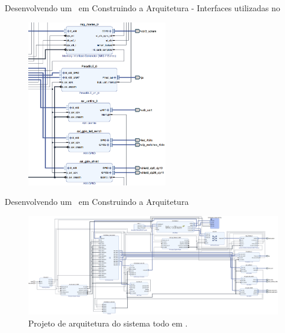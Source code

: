 \begin{frame}{Desenvolvendo um \Wearable\ em \Software }{Construindo a Arquitetura - Interfaces utilizadas no \design}
\vspace{-0.8em}
\begin{figure}[h] \centering
    \includegraphics[width=0.55\textwidth]{img/vivado_software/6-axi_outputs.png}
    \vspace{-1em}
\end{figure}
\end{frame}

\begin{frame}{Desenvolvendo um \Wearable\ em \Software }{Construindo a Arquitetura}
\vspace{-0.8em}
\begin{figure}[h] \centering
    \includegraphics[width=1\textwidth]{img/vivado_software/7-all.png}
    \vspace{-1em}
    \caption{Projeto de arquitetura do sistema todo em \software .}
\end{figure}
\end{frame}

%    


